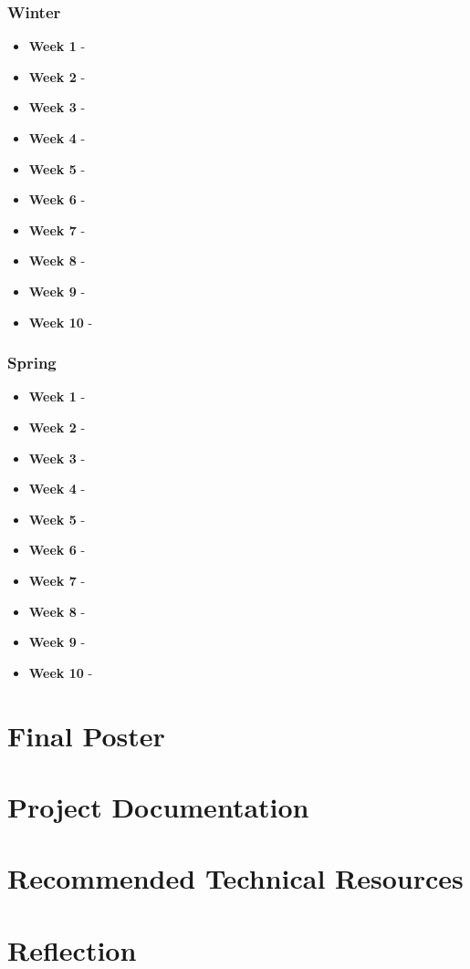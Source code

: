 \documentclass[onecolumn, draftclsnofoot,10pt, compsoc]{IEEEtran}
\begin{document}
			\subsubsection{Winter}
			\begin{itemize}
					\item \textbf{Week 1} - 
					\item \textbf{Week 2} - 
					\item \textbf{Week 3} - 
					\item \textbf{Week 4} - 
					\item \textbf{Week 5} - 
					\item \textbf{Week 6} - 
					\item \textbf{Week 7} - 
					\item \textbf{Week 8} - 
					\item \textbf{Week 9} - 
					\item \textbf{Week 10} - 
				\end{itemize}
			\subsubsection{Spring}
				\begin{itemize}
					\item \textbf{Week 1} - 
					\item \textbf{Week 2} - 
					\item \textbf{Week 3} - 
					\item \textbf{Week 4} - 
					\item \textbf{Week 5} - 
					\item \textbf{Week 6} - 
					\item \textbf{Week 7} - 
					\item \textbf{Week 8} - 
					\item \textbf{Week 9} - 
					\item \textbf{Week 10} - 
				\end{itemize}
	\section{Final Poster}
	\section{Project Documentation}
	\section{Recommended Technical Resources}
	\section{Reflection}
\end{document}
